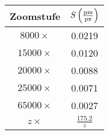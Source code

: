 \begin{tabular}{cc}
		\toprule
		Zoomstufe				&$S \left( \SI{}{\frac{\micro\metre}{px}}\right) $	\\
		\midrule
			$8000\times	$		&0.0219				\\
			$15000\times$		&0.0120				\\
			$20000\times$		&0.0088				\\
			$25000\times$		&0.0071				\\
			$65000\times$		&0.0027				\\
			$z \times$			&$\frac{175.2}{z}$	\\
		\bottomrule
	\end{tabular}